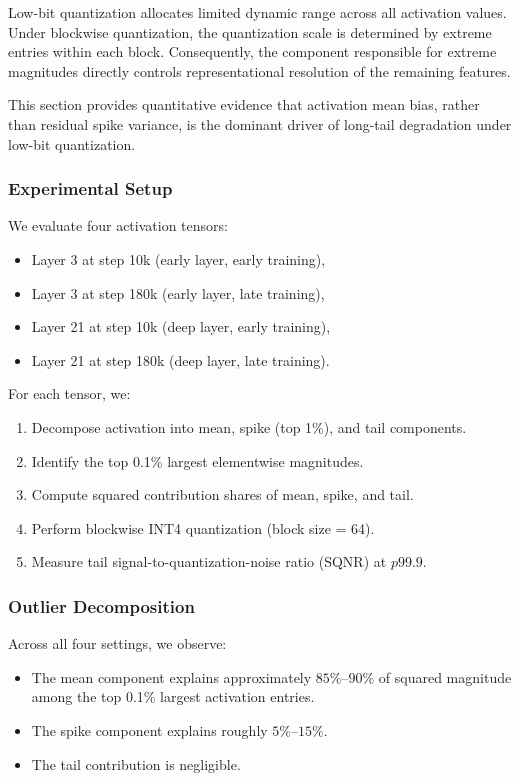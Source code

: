 Low-bit quantization allocates limited dynamic range across all activation values.
Under blockwise quantization, the quantization scale is determined by extreme
entries within each block.
Consequently, the component responsible for extreme magnitudes directly
controls representational resolution of the remaining features.

This section provides quantitative evidence that activation mean bias,
rather than residual spike variance, is the dominant driver of
long-tail degradation under low-bit quantization.

\subsubsection{Experimental Setup}

We evaluate four activation tensors:

\begin{itemize}
\item Layer 3 at step 10k (early layer, early training),
\item Layer 3 at step 180k (early layer, late training),
\item Layer 21 at step 10k (deep layer, early training),
\item Layer 21 at step 180k (deep layer, late training).
\end{itemize}

For each tensor, we:

\begin{enumerate}
\item Decompose activation into mean, spike (top 1\%), and tail components.
\item Identify the top 0.1\% largest elementwise magnitudes.
\item Compute squared contribution shares of mean, spike, and tail.
\item Perform blockwise INT4 quantization (block size = 64).
\item Measure tail signal-to-quantization-noise ratio (SQNR) at $p99.9$.
\end{enumerate}

\subsubsection{Outlier Decomposition}

Across all four settings, we observe:

\begin{itemize}
\item The mean component explains approximately $85\%$–$90\%$
of squared magnitude among the top 0.1\% largest activation entries.
\item The spike component explains roughly $5\%$–$15\%$.
\item The tail contribution is negligible.
\end{itemize}

